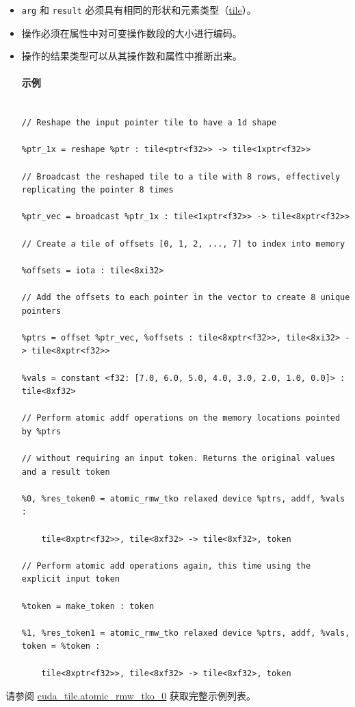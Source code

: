 \documentclass{article}
\begin{document}
\begin{itemize}
\item \texttt{arg} 和 \texttt{result} 必须具有相同的形状和元素类型（\href{https://docs.nvidia.com/cuda/tile-ir/latest/sections/types.html#type-tile}{tile}）。
\item 操作必须在属性中对可变操作数段的大小进行编码。
\item 操作的结果类型可以从其操作数和属性中推断出来。




\paragraph{示例}


\begin{lstlisting}

// Reshape the input pointer tile to have a 1d shape

%ptr_1x = reshape %ptr : tile<ptr<f32>> -> tile<1xptr<f32>>

// Broadcast the reshaped tile to a tile with 8 rows, effectively replicating the pointer 8 times

%ptr_vec = broadcast %ptr_1x : tile<1xptr<f32>> -> tile<8xptr<f32>>

// Create a tile of offsets [0, 1, 2, ..., 7] to index into memory

%offsets = iota : tile<8xi32>

// Add the offsets to each pointer in the vector to create 8 unique pointers

%ptrs = offset %ptr_vec, %offsets : tile<8xptr<f32>>, tile<8xi32> -> tile<8xptr<f32>>

%vals = constant <f32: [7.0, 6.0, 5.0, 4.0, 3.0, 2.0, 1.0, 0.0]> : tile<8xf32>

// Perform atomic addf operations on the memory locations pointed by %ptrs

// without requiring an input token. Returns the original values and a result token

%0, %res_token0 = atomic_rmw_tko relaxed device %ptrs, addf, %vals :

    tile<8xptr<f32>>, tile<8xf32> -> tile<8xf32>, token

// Perform atomic add operations again, this time using the explicit input token

%token = make_token : token

%1, %res_token1 = atomic_rmw_tko relaxed device %ptrs, addf, %vals, token = %token :

    tile<8xptr<f32>>, tile<8xf32> -> tile<8xf32>, token

\end{lstlisting}



\end{itemize}
请参阅 \href{https://docs.nvidia.com/cuda/tile-ir/latest/sections/appendix.html#example-cuda-tile-atomic-rmw-tko-0}{cuda\_tile.atomic\_rmw\_tko\_0} 获取完整示例列表。
\end{document}
